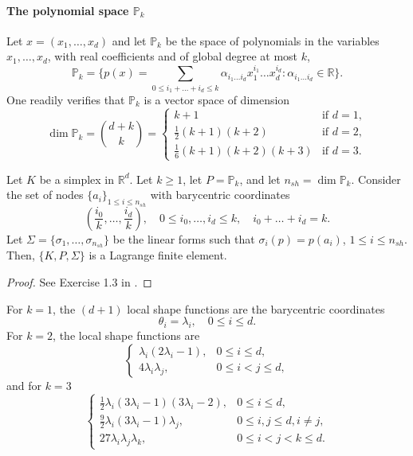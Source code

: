 \paragraph{The polynomial space $\mathbb{P}_k$} Let $x = (x_1, \dots, x_d)$ and let $\mathbb{P}_k$ be the space of polynomials in the variables $x_1, \dots, x_d$, with real coefficients and of global degree at most $k$,
\begin{equation*}
\mathbb{P}_k = \{ p(x) = \sum_{0 \le i_1 + \dots + i_d \le k} \alpha_{i_1 \dots i_d} x_1^{i_1} \dots x_d^{i_d} : \alpha_{i_1 \dots i_d} \in \mathbb{R} \}.
\end{equation*}
One readily verifies that $\mathbb{P}_k$ is a vector space of dimension
\begin{equation*}
\dim \mathbb{P}_k = \binom{d+k}{k} = \begin{cases} k+1 & \text{if } d=1, \\ \frac{1}{2}(k+1)(k+2) & \text{if } d=2, \\ \frac{1}{6}(k+1)(k+2)(k+3) & \text{if } d=3. \end{cases}
\end{equation*}
\begin{lemma}\label{lemma:simplicial_lagrange_fe}
    Let $K$ be a simplex in $\mathbb{R}^d$. Let $k \ge 1$, let $P = \mathbb{P}_k$, and let $n_{sh} = \dim \mathbb{P}_k$. Consider the set of nodes $\{a_i\}_{1 \le i \le n_{sh}}$ with barycentric coordinates
    \begin{equation*}
\left(\frac{i_0}{k}, \dots, \frac{i_d}{k}\right), \quad 0 \le i_0, \dots, i_d \le k, \quad i_0 + \dots + i_d = k.
\end{equation*}
    Let $\Sigma = \{\sigma_1, \dots, \sigma_{n_{sh}}\}$ be the linear forms such that $\sigma_i(p) = p(a_i)$, $1 \le i \le n_{sh}$. Then, $\{K, P, \Sigma\}$ is a Lagrange finite element.
    \begin{proof}
        See Exercise 1.3 in \cite{ern2004theory}.
    \end{proof}
\end{lemma}

For $k=1$, the $(d+1)$ local shape functions are the barycentric coordinates
\begin{equation*}
\theta_i = \lambda_i, \quad 0 \le i \le d.
\end{equation*}
For $k=2$, the local shape functions are
\begin{equation*}
\begin{cases} \lambda_i(2\lambda_i - 1), & 0 \le i \le d, \\ 4\lambda_i \lambda_j, & 0 \le i < j \le d, \end{cases}
\end{equation*}
and for $k=3$
\begin{equation*}
\begin{cases} \frac{1}{2}\lambda_i(3\lambda_i - 1)(3\lambda_i - 2), & 0 \le i \le d, \\ \frac{9}{2}\lambda_i(3\lambda_i - 1)\lambda_j, & 0 \le i,j \le d, i \ne j, \\ 27\lambda_i \lambda_j \lambda_k, & 0 \le i < j < k \le d. \end{cases}
\end{equation*}
